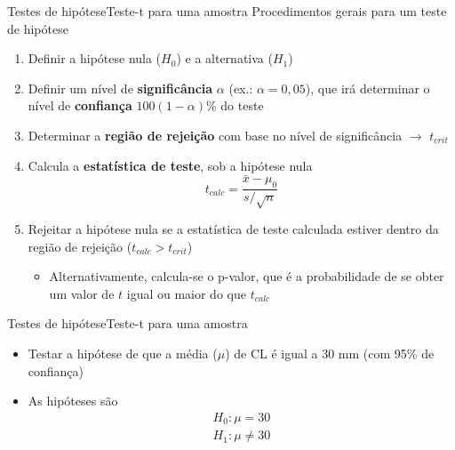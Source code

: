 \documentclass[10pt]{beamer}\usepackage[]{graphicx}\usepackage[]{color}
\theoremstyle{definition}
\begin{document}
\begin{frame}[fragile]{Testes de hipótese}{Teste-t
    para uma amostra}
Procedimentos gerais para um teste de hipótese
\begin{enumerate}[(1)]
\item Definir a hipótese nula ($H_0$) e a alternativa ($H_1$)
\item Definir um nível de \textbf{significância} $\alpha$ (ex.: $\alpha
  = 0,05$), que irá determinar o nível de \textbf{confiança}
  $100(1-\alpha)\%$ do teste
\item Determinar a \textbf{região de rejeição} com base no nível de
  significância $\rightarrow$ $t_{crit}$
\item Calcula a \textbf{estatística de teste}, sob a hipótese nula
  \begin{equation*}
    t_{calc} = \frac{\bar{x} - \mu_0}{s/\sqrt{n}}
  \end{equation*}
\item Rejeitar a hipótese nula se a estatística de teste calculada
  estiver dentro da região de rejeição ($t_{calc} > t_{crit}$)
  \begin{itemize}
  \item Alternativamente, calcula-se o p-valor, que é a probabilidade de
    se obter um valor de $t$ igual ou maior do que $t_{calc}$
  \end{itemize}
\end{enumerate}
\end{frame}

\begin{frame}[fragile]{Testes de hipótese}{Teste-t para uma
    amostra}
  \begin{itemize}
  \item Testar a hipótese de que a média ($\mu$) de CL é igual a 30 mm
    (com 95\% de confiança)
  \item As hipóteses são
    \begin{align*}
      H_0: \mu = 30 \\
      H_1: \mu \neq 30
    \end{align*}
  \end{itemize}
\end{frame}
\end{document}
